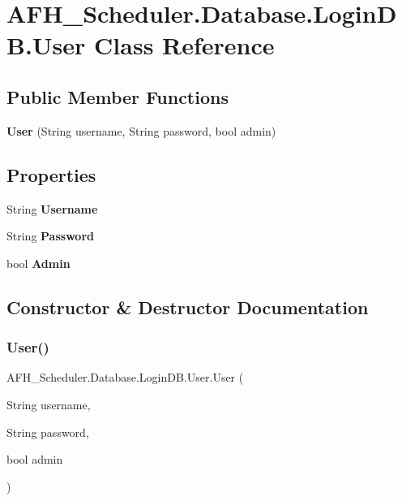 \section{A\+F\+H\+\_\+\+Scheduler.\+Database.\+Login\+D\+B.\+User Class Reference}
\label{class_a_f_h___scheduler_1_1_database_1_1_login_d_b_1_1_user}
\subsection*{Public Member Functions}
\begin{DoxyCompactItemize}
\item 
\textbf{ User} (String username, String password, bool admin)
\end{DoxyCompactItemize}
\subsection*{Properties}
\begin{DoxyCompactItemize}
\item 
String \textbf{ Username}\hspace{0.3cm}{\ttfamily  [get, set]}
\item 
String \textbf{ Password}\hspace{0.3cm}{\ttfamily  [get, set]}
\item 
bool \textbf{ Admin}\hspace{0.3cm}{\ttfamily  [get, set]}
\end{DoxyCompactItemize}


\subsection{Constructor \& Destructor Documentation}
\mbox{\label{class_a_f_h___scheduler_1_1_database_1_1_login_d_b_1_1_user_a7731c2735c055294136521be628849a5}} 
\subsubsection{User()}
{\footnotesize\ttfamily A\+F\+H\+\_\+\+Scheduler.\+Database.\+Login\+D\+B.\+User.\+User (\begin{DoxyParamCaption}\item[{String}]{username,  }\item[{String}]{password,  }\item[{bool}]{admin }\end{DoxyParamCaption})}



